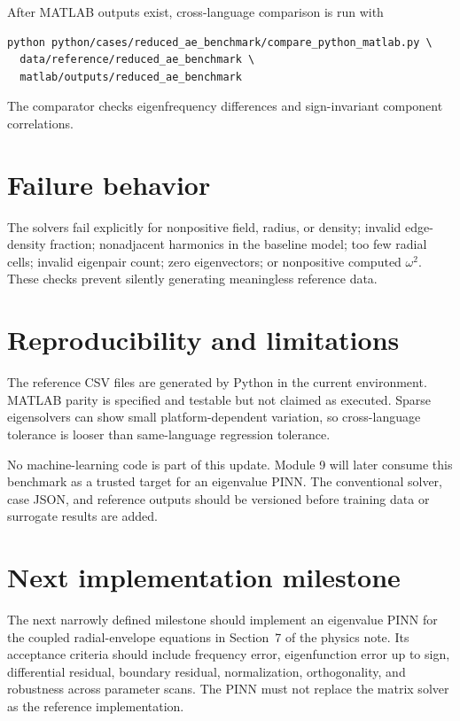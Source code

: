 \documentclass[11pt]{article}
\begin{document}
After MATLAB outputs exist, cross-language comparison is run with
\begin{verbatim}
python python/cases/reduced_ae_benchmark/compare_python_matlab.py \
  data/reference/reduced_ae_benchmark \
  matlab/outputs/reduced_ae_benchmark
\end{verbatim}
The comparator checks eigenfrequency differences and sign-invariant component correlations.

\section{Failure behavior}
The solvers fail explicitly for nonpositive field, radius, or density; invalid edge-density fraction; nonadjacent harmonics in the baseline model; too few radial cells; invalid eigenpair count; zero eigenvectors; or nonpositive computed $\omega^2$. These checks prevent silently generating meaningless reference data.

\section{Reproducibility and limitations}
The reference CSV files are generated by Python in the current environment. MATLAB parity is specified and testable but not claimed as executed. Sparse eigensolvers can show small platform-dependent variation, so cross-language tolerance is looser than same-language regression tolerance.

No machine-learning code is part of this update. Module 9 will later consume this benchmark as a trusted target for an eigenvalue PINN. The conventional solver, case JSON, and reference outputs should be versioned before training data or surrogate results are added.

\section{Next implementation milestone}
The next narrowly defined milestone should implement an eigenvalue PINN for the coupled radial-envelope equations in Section~7 of the physics note. Its acceptance criteria should include frequency error, eigenfunction error up to sign, differential residual, boundary residual, normalization, orthogonality, and robustness across parameter scans. The PINN must not replace the matrix solver as the reference implementation.
\end{document}
